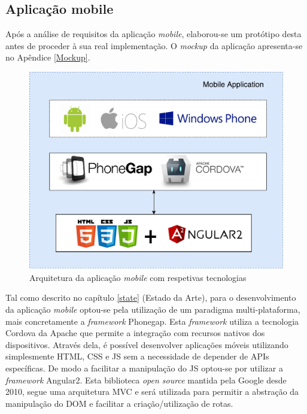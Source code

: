 
\subsection{Aplicação mobile}

Após a análise de requisitos da aplicação \textit{mobile}, elaborou-se um protótipo desta antes de proceder à sua real implementação. O \textit{mockup} da aplicação apresenta-se no Apêndice \ref{Mockup}. 

\begin{figure}[h]
	\centering
	\includegraphics[scale = 0.4]{esquemas/arquitetura-mobile.pdf}
	\caption{Arquitetura da aplicação \textit{mobile} com respetivas tecnologias}
	\label{arquiteturamobile}
\end{figure}

\newpage


Tal como descrito no capítulo \ref{state} (Estado da Arte), para o desenvolvimento da aplicação \textit{mobile} optou-se pela utilização de um paradigma multi-plataforma, mais concretamente a \textit{framework} Phonegap. Esta \textit{framework} utiliza a tecnologia Cordova da Apache que permite a integração com recursos nativos dos dispositivos. Através dela, é possível desenvolver aplicações móveis utilizando simplesmente \ac{HTML}, \ac{CSS} e \ac{JS} sem a necessidade de depender de APIs específicas. De modo a facilitar a manipulação do \ac{JS} optou-se por utilizar a \textit{framework} Angular2. Esta biblioteca \textit{open source} mantida pela Google desde 2010, segue uma arquitetura \ac{MVC} e será utilizada para permitir a abstração da manipulação do \ac{DOM} e facilitar a criação/utilização de rotas\cite{Google2015}.

